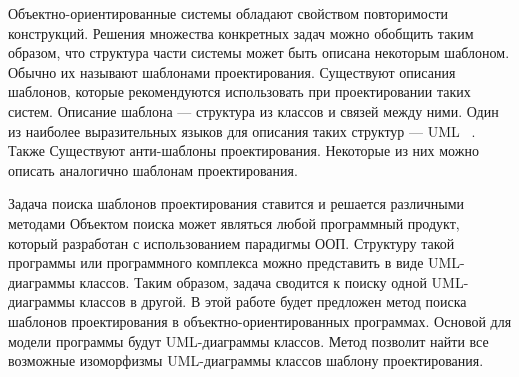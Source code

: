 \Introduction


Объектно-ориентированные системы обладают свойством повторимости конструкций.
Решения множества конкретных задач можно обобщить таким образом,
что структура части системы может быть описана некоторым шаблоном.
Обычно их называют шаблонами проектирования.
Существуют описания шаблонов, которые рекомендуются использовать при
проектировании таких систем.
Описание шаблона --- структура из классов и связей между ними.
Один из наиболее выразительных языков для описания таких структур --- UML
~\cite{UMLSuperstructure}.
Также Существуют анти-шаблоны проектирования.
Некоторые из них можно описать аналогично шаблонам проектирования.

Задача поиска шаблонов проектирования ставится и решается различными методами
Объектом поиска может являться любой программный продукт, который разработан с
использованием парадигмы ООП.
Структуру такой программы или программного комплекса можно представить в виде
UML-диаграммы классов.
Таким образом, задача сводится к поиску одной UML-диаграммы классов в другой.
В этой работе будет предложен метод поиска шаблонов проектирования в
объектно-ориентированных программах.
Основой для модели программы будут UML-диаграммы классов.
Метод позволит найти все возможные изоморфизмы UML-диаграммы классов шаблону
проектирования.

